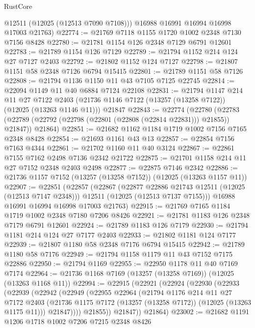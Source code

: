 \begin{lexlean}{RustCore}
\begin{coremodule}
        @12511
        (@12025 (@12513 @7090 @7108)))
      @16988
      @16991
      @16994
      @16998
      @17003
      @21763)
@22774 := @21769 @7118 @1155 @1720 @1002 @2348 @7130 @7156 @8428
@22780 := @21781 @1154 @126 @2348 @7129 @6791 @12601
@22783 := @21789 @1154 @126 @7129
@22789 := @21794 @1152 @214 @124 @27 @7127 @2403
@22792 := @21802 @1152 @124 @7127
@22798 := @21807 @1151 @58 @2348 @7126 @6794 @15415
@22801 := @21789 @1151 @58 @7126
@22808 := @21794 @1136 @1150 @11 @43 @7105 @7125 @22745
@22814 := @22094 @1149 @11 @40 @6884 @7124 @22108
@22831 := @21794
    @1147
    @214
    @11
    @27
    @7122
    @2403
    (@21736 @1146 @7122 (@13257 (@13258 @7122)) (@12025 (@13263 @1146 @11)))
    @21847
@22843 := @22774
    (@22780
      (@22783 (@22789 (@22792 (@22798 (@22801 (@22808 (@22814 @22831))) @21855)) @21847))
      @21864)
@22851 := @21682 @1162 @1184 @1719 @1002 @7156 @7165 @2348 @8428
@22854 := @21693 @1161 @43 @13
@22857 := @22854 @7156 @7163 @4344
@22861 := @21702 @1160 @11 @40 @3124
@22867 := @22861 @7155 @7162 @2498 @7136 @2342 @21722
@22875 := @21701 @1158 @214 @11 @27 @7152 @2348 @2403 @2498
@22877 := @22875 @7146 @2342
@22886 := @21736 @1157 @7152 (@13257 (@13258 @7152)) (@12025 (@13263 @1157 @11))
@22907 := @22851
    (@22857
      (@22867
        (@22877 @22886 @21743 @12511 (@12025 (@12513 @7147 @2348)))
        @12511
        (@12025 (@12513 @7137 @7155)))
      @16988
      @16991
      @16994
      @16998
      @17003
      @21763)
@22915 := @21769 @7165 @1184 @1719 @1002 @2348 @7180 @7206 @8426
@22921 := @21781 @1183 @126 @2348 @7179 @6791 @12601
@22924 := @21789 @1183 @126 @7179
@22930 := @21794 @1181 @214 @124 @27 @7177 @2403
@22933 := @21802 @1181 @124 @7177
@22939 := @21807 @1180 @58 @2348 @7176 @6794 @15415
@22942 := @21789 @1180 @58 @7176
@22949 := @21794 @1158 @1179 @11 @43 @7152 @7175 @22886
@22950 := @21794 @1169
@22955 := @22950 @1178 @11 @40 @7169 @7174
@22964 := @21736 @1168 @7169 (@13257 (@13258 @7169)) (@12025 (@13263 @1168 @11))
@22994 := @22915
    (@22921
      (@22924
        (@22930
          (@22933
            (@22939
              (@22942
                (@22949
                  (@22955
                    @22964
                    (@21794
                      @1176
                      @214
                      @11
                      @27
                      @7172
                      @2403
                      (@21736 @1175 @7172 (@13257 (@13258 @7172)) (@12025 (@13263 @1175 @11)))
                      @21847))))
              @21855))
          @21847))
      @21864)
@23002 := @21682 @1191 @1206 @1718 @1002 @7206 @7215 @2348 @8426

\end{coremodule}
\end{lexlean}
